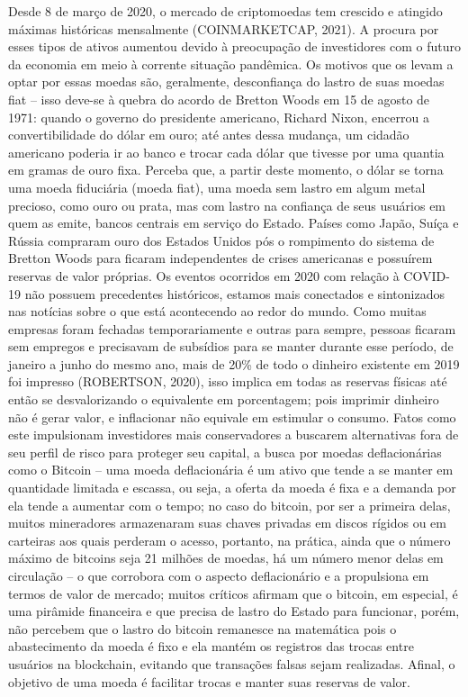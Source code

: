 \documentclass[onecolumn,12pt]{asme2ej}
\begin{document}
Desde 8 de março de 2020, o mercado de criptomoedas tem crescido e atingido máximas históricas mensalmente (COINMARKETCAP, 2021). A procura por esses tipos de ativos aumentou devido à preocupação de investidores com o futuro da economia em meio à corrente situação pandêmica. Os motivos que os levam a optar por essas moedas são, geralmente, desconfiança do lastro de suas moedas fiat – isso deve-se à quebra do acordo de Bretton Woods em 15 de agosto de 1971: quando o governo do presidente americano, Richard Nixon, encerrou a convertibilidade do dólar em ouro; até antes dessa mudança, um cidadão americano poderia ir ao banco e trocar cada dólar que tivesse por uma quantia em gramas de ouro fixa. Perceba que, a partir deste momento, o dólar se torna uma moeda fiduciária (moeda fiat), uma moeda sem lastro em algum metal precioso, como ouro ou prata, mas com lastro na confiança de seus usuários em quem as emite, bancos centrais em serviço do Estado. Países como Japão, Suíça e Rússia compraram ouro dos Estados Unidos pós o rompimento do sistema de Bretton Woods para ficaram independentes de crises americanas e possuírem reservas de valor próprias. Os eventos ocorridos em 2020 com relação à COVID-19 não possuem precedentes históricos, estamos mais conectados e sintonizados nas notícias sobre o que está acontecendo ao redor do mundo. Como muitas empresas foram fechadas temporariamente e outras para sempre, pessoas ficaram sem empregos e precisavam de subsídios para se manter durante esse período, de janeiro a junho do mesmo ano, mais de 20\% de todo o dinheiro existente em 2019 foi impresso (ROBERTSON, 2020), isso implica em todas as reservas físicas até então se desvalorizando o equivalente em porcentagem; pois imprimir dinheiro não é gerar valor, e inflacionar não equivale em estimular o consumo. Fatos como este impulsionam investidores mais conservadores a buscarem alternativas fora de seu perfil de risco para proteger seu capital, a busca por moedas deflacionárias como o Bitcoin – uma moeda deflacionária é um ativo que tende a se manter em quantidade limitada e escassa, ou seja, a oferta da moeda é fixa e a demanda por ela tende a aumentar com o tempo; no caso do bitcoin, por ser a primeira delas, muitos mineradores armazenaram suas chaves privadas em discos rígidos ou em carteiras aos quais perderam o acesso, portanto, na prática, ainda que o número máximo de bitcoins seja 21 milhões de moedas, há um número menor delas em circulação – o que corrobora com o aspecto deflacionário e a propulsiona em termos de valor de mercado; muitos críticos afirmam que o bitcoin, em especial, é uma pirâmide financeira e que precisa de lastro do Estado para funcionar, porém, não percebem que o lastro do bitcoin remanesce na matemática pois o abastecimento da moeda é fixo e ela mantém os registros das trocas entre usuários na blockchain, evitando que transações falsas sejam realizadas. Afinal, o objetivo de uma moeda é facilitar trocas e manter suas reservas de valor.
\end{document}

